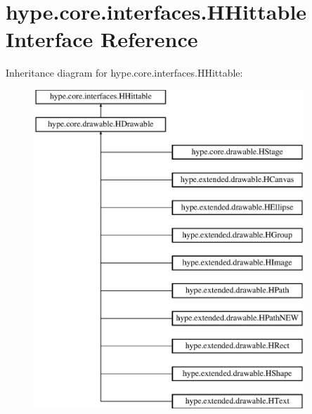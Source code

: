 \hypertarget{interfacehype_1_1core_1_1interfaces_1_1_h_hittable}{\section{hype.\-core.\-interfaces.\-H\-Hittable Interface Reference}
\label{interfacehype_1_1core_1_1interfaces_1_1_h_hittable}
}
Inheritance diagram for hype.\-core.\-interfaces.\-H\-Hittable\-:\begin{figure}[H]
\begin{center}
\leavevmode
\includegraphics[height=12.000000cm]{interfacehype_1_1core_1_1interfaces_1_1_h_hittable}
\end{center}
\end{figure}
